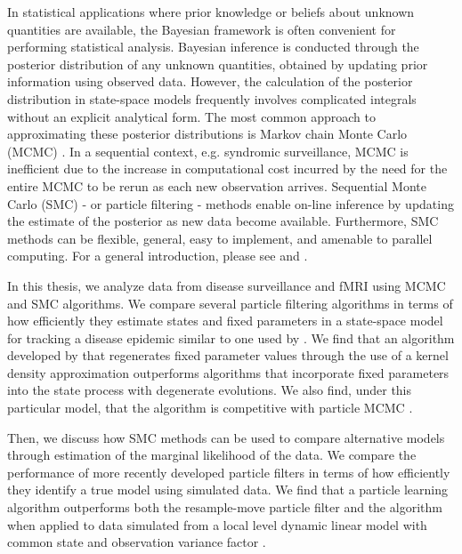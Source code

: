 In statistical applications where prior knowledge or beliefs about unknown quantities are available, the Bayesian framework is often convenient for performing statistical analysis.  Bayesian inference is conducted through the posterior distribution of any unknown quantities, obtained by updating prior information using observed data. However, the calculation of the posterior distribution in state-space models frequently involves complicated integrals without an explicit analytical form. The most common approach to approximating these posterior distributions is Markov chain Monte Carlo (MCMC) \citep{Gelf:Smit:samp:1990}. In a sequential context, e.g. syndromic surveillance, MCMC is inefficient due to the increase in computational cost incurred by the need for the entire MCMC to be rerun as each new observation arrives. Sequential Monte Carlo (SMC) - or particle filtering - methods enable on-line inference by updating the estimate of the posterior as new data become available. Furthermore, SMC methods can be flexible, general, easy to implement, and amenable to parallel computing. For a general introduction, please see \cite{Douc:deFr:Gord:sequ:2001} and \cite{cappe2007overview}.

In this thesis, we analyze data from disease surveillance and fMRI using MCMC and SMC algorithms. We compare several particle filtering algorithms in terms of how efficiently they estimate states and fixed parameters in a state-space model for tracking a disease epidemic similar to one used by \citet{skvortsov2012monitoring}. We find that an algorithm developed by \citet{Liu:West:comb:2001} that regenerates fixed parameter values through the use of a kernel density approximation outperforms algorithms that incorporate fixed parameters into the state process with degenerate evolutions. We also find, under this particular model, that the \citet{Liu:West:comb:2001} algorithm is competitive with particle MCMC \citep{Andr:Douc:Hol:pmcmc:2010}.

Then, we discuss how SMC methods can be used to compare alternative models through estimation of the marginal likelihood of the data. We compare the performance of more recently developed particle filters in terms of how efficiently they identify a true model using simulated data. We find that a particle learning algorithm \citep{Carv:Joha:Lope:Pols:part} outperforms both the resample-move particle filter \citep{Gilk:Berz:foll:2001} and the \citet{Liu:West:comb:2001} algorithm when applied to data simulated from a local level dynamic linear model with common state and observation variance factor \cite[Chapter 4.3.1][]{petris:camp:2009:dynamic}.

